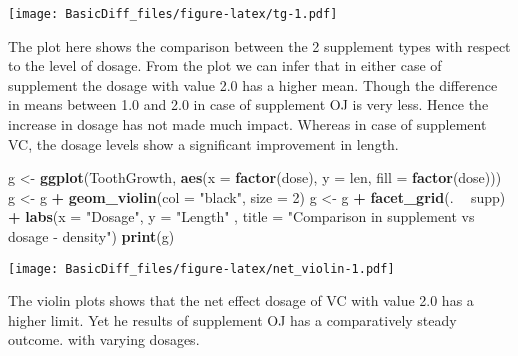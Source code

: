 \documentclass[
]{article}
\newenvironment{Shaded}{\begin{snugshade}}{\end{snugshade}}
\newcommand{\DataTypeTok}[1]{\textcolor[rgb]{0.13,0.29,0.53}{#1}}
\newcommand{\DecValTok}[1]{\textcolor[rgb]{0.00,0.00,0.81}{#1}}
\newcommand{\KeywordTok}[1]{\textcolor[rgb]{0.13,0.29,0.53}{\textbf{#1}}}
\newcommand{\NormalTok}[1]{#1}
\newcommand{\OperatorTok}[1]{\textcolor[rgb]{0.81,0.36,0.00}{\textbf{#1}}}
\newcommand{\StringTok}[1]{\textcolor[rgb]{0.31,0.60,0.02}{#1}}
\begin{document}
\texttt{[image: BasicDiff\_files/figure-latex/tg-1.pdf]}

The plot here shows the comparison between the 2 supplement types with
respect to the level of dosage. From the plot we can infer that in
either case of supplement the dosage with value 2.0 has a higher mean.
Though the difference in means between 1.0 and 2.0 in case of supplement
OJ is very less. Hence the increase in dosage has not made much impact.
Whereas in case of supplement VC, the dosage levels show a significant
improvement in length.

\begin{Shaded}
\begin{Highlighting}[]
\NormalTok{g <-}\StringTok{ }\KeywordTok{ggplot}\NormalTok{(ToothGrowth, }\KeywordTok{aes}\NormalTok{(}\DataTypeTok{x =} \KeywordTok{factor}\NormalTok{(dose), }\DataTypeTok{y =}\NormalTok{ len, }\DataTypeTok{fill =} \KeywordTok{factor}\NormalTok{(dose)))}
\NormalTok{g <-}\StringTok{ }\NormalTok{g }\OperatorTok{+}\StringTok{ }\KeywordTok{geom_violin}\NormalTok{(}\DataTypeTok{col =} \StringTok{"black"}\NormalTok{, }\DataTypeTok{size =} \DecValTok{2}\NormalTok{)}
\NormalTok{g <-}\StringTok{ }\NormalTok{g }\OperatorTok{+}\StringTok{ }\KeywordTok{facet_grid}\NormalTok{(. }\OperatorTok{~}\StringTok{ }\NormalTok{supp) }\OperatorTok{+}\StringTok{ }\KeywordTok{labs}\NormalTok{(}\DataTypeTok{x =} \StringTok{"Dosage"}\NormalTok{, }\DataTypeTok{y =} \StringTok{"Length"}\NormalTok{ , }\DataTypeTok{title =} \StringTok{"Comparison in supplement vs dosage - density"}\NormalTok{)}
\KeywordTok{print}\NormalTok{(g)}
\end{Highlighting}
\end{Shaded}

\texttt{[image: BasicDiff\_files/figure-latex/net\_violin-1.pdf]}

The violin plots shows that the net effect dosage of VC with value 2.0
has a higher limit. Yet he results of supplement OJ has a comparatively
steady outcome. with varying dosages.
\end{document}
